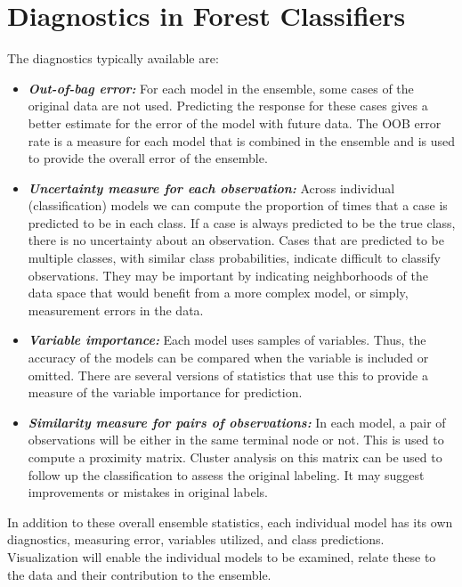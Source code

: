 \documentclass[smallextended,natbib]{svjour3}\usepackage[]{graphicx}\usepackage[]{xcolor}
\begin{document}
\section{Diagnostics in Forest Classifiers}\label{key}

The diagnostics typically available are:

\begin{itemize} \itemsep 0in
\item {\em \textbf{Out-of-bag error:}} For each model in the ensemble, some cases of the original data are not used. Predicting the response for these cases gives a better estimate for the error of the model with future data. The OOB error rate is a measure for each model that is combined in the ensemble and is used to provide the overall error of the ensemble.\\

\item {\em \textbf{Uncertainty measure for each observation:}} Across individual (classification) models we can compute the proportion of times that a case is predicted to be in each class. If a case is always predicted to be the true class, there is no uncertainty about an observation. Cases that are predicted to be multiple classes, with similar class probabilities, indicate  difficult to classify observations. They may be important by indicating neighborhoods of the data space that would benefit from a more complex model, or simply, measurement errors in the data.\\

\item {\em \textbf{Variable importance:}} Each model uses samples of variables. Thus, the accuracy of the models can be compared when the variable is included or omitted. There are several versions of statistics that use this to provide a measure of the variable importance for prediction.\\

\item {\em \textbf{Similarity measure for pairs of observations:}} In each model, a pair of observations will be either in the same terminal node or not. This is used to compute a proximity matrix. Cluster analysis on this matrix can be used to follow up the classification to assess the original labeling. It may suggest improvements or mistakes in original labels.
\end{itemize}
In addition to these overall ensemble statistics, each individual model has its own diagnostics, measuring error, variables utilized, and class predictions. Visualization will enable the individual models to be examined, relate these to the data and their contribution to the ensemble.
\end{document}
